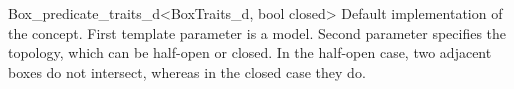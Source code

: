 
\ccRefPageBegin
\begin{ccRefClass}{Box_predicate_traits_d<BoxTraits_d, bool closed>}
\ccDefinition
Default implementation of the  concept. First template parameter is a  model. Second parameter specifies the topology, which can be half-open or closed. In the half-open case, two adjacent boxes do not intersect, whereas in the closed case they do.


\ccIsModel
{}


\end{ccRefClass}


\ccRefPageEnd
